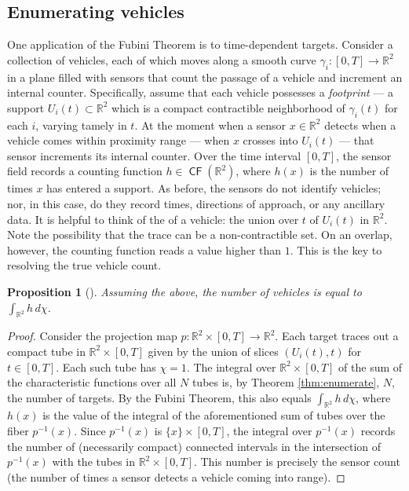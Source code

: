 \documentclass{psapm-l}
\newtheorem{proposition}[theorem]{Proposition}
\theoremstyle{definition}
\theoremstyle{remark}
\numberwithin{equation}{section}
\begin{document}
\subsection{Enumerating vehicles}
One application of the Fubini Theorem is to time-dependent targets. Consider a collection of vehicles, each of which moves along a smooth curve $\gamma_i:[0,T]\to{{\mathbb R}}^2$ in a plane filled with sensors that count the passage of a vehicle and increment an internal counter. Specifically, assume that each vehicle possesses a {\em footprint} --- a support $U_i(t)\subset{{\mathbb R}}^2$ which is a compact contractible neighborhood of $\gamma_i(t)$ for each $i$, varying tamely in $t$. At the moment when a sensor $x\in{{\mathbb R}}^2$ detects when a vehicle comes within proximity range --- when $x$ crosses into $U_i(t)$ --- that sensor increments its internal counter. Over the time interval $[0,T]$, the sensor field records a counting function $h\in{{{\operatorname{\mathsf{{CF}}}}}}({{\mathbb R}}^2)$, where $h(x)$ is the number of times $x$ has entered a support. As before, the sensors do not identify vehicles; nor, in this case, do they record times, directions of approach, or any ancillary data. It is helpful to think of the {{}} of a vehicle: the union over $t$ of $U_i(t)$ in ${{\mathbb R}}^2$. Note the possibility that the trace can be a non-contractible set. On an overlap, however, the counting function reads a value higher than $1$. This is the key to resolving the true vehicle count.

\begin{proposition}[\cite{BG:enum}]
\label{prop:t-dep-euler}
Assuming the above, the number of vehicles is equal to $\int_{{{\mathbb R}}^2}h\,d\chi$.
\end{proposition}
\begin{proof}
Consider the projection map $p\colon{{\mathbb R}}^2\times[0,T]\to{{\mathbb R}}^2$. Each target traces out a compact tube in ${{\mathbb R}}^2\times[0,T]$ given by the union of slices $(U_i(t),t)$ for $t\in[0,T]$. Each such tube has $\chi=1$. The integral over ${{\mathbb R}}^2\times[0,T]$ of the sum of the characteristic functions over all $N$ tubes is, by Theorem \ref{thm:enumerate}, $N$, the number of targets. By the Fubini Theorem, this also equals $\int_{{{\mathbb R}}^2}h\,d\chi$, where $h(x)$ is the value of the integral of the aforementioned sum of tubes over the fiber $p{^{-1}}(x)$. Since $p{^{-1}}(x)$ is $\{x\}\times[0,T]$, the integral over $p{^{-1}}(x)$ records the number of (necessarily compact) connected intervals in the intersection of $p{^{-1}}(x)$ with the tubes in ${{\mathbb R}}^2\times[0,T]$. This number is precisely the sensor count (the number of times a sensor detects a vehicle coming into range).
\end{proof}
\end{document}
